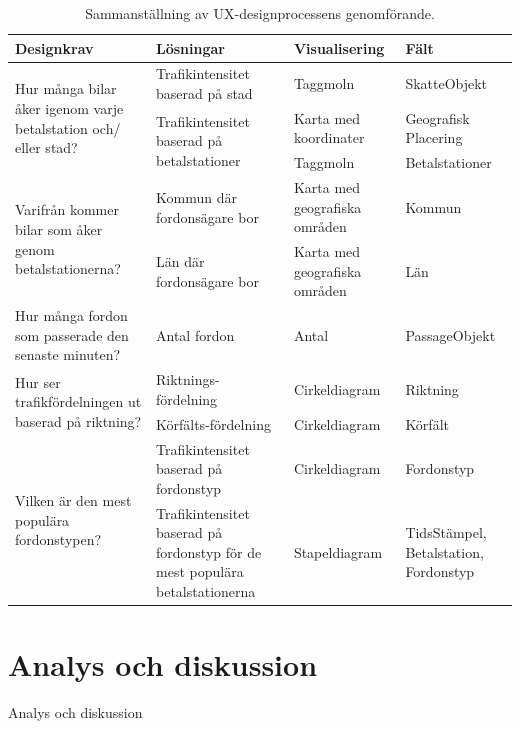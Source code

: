 \documentclass[12pt]{kththesis}
\begin{document}
\begin{table}[h!]
  \begin{center}
  \caption{Sammanställning av UX-designprocessens genomförande.}
    \label{tab:table1}
 \begin{tabular}{|p{3cm}|p{3cm}|p{3cm}|p{3cm}|}
      \hline
     \textbf{Designkrav} & \textbf{Lösningar} & \textbf{Visualisering} & \textbf{Fält}\\
     \hline
  \multirow{3}{3cm}{Hur många bilar åker igenom varje betalstation och/ eller stad?} &  Trafikintensitet baserad på stad & Taggmoln  & SkatteObjekt\\\cline{2-4}
  & \multirow{2}{3cm}{Trafikintensitet baserad på betalstationer} & Karta med koordinater
& Geografisk Placering\\\cline{3-4}  
  & &  Taggmoln
& Betalstationer \\ \hline


  \multirow{2}{3cm}{Varifrån kommer bilar som åker genom betalstationerna?} &  Kommun där fordonsägare bor & Karta med geografiska områden  & Kommun\\\cline{2-4}
  &Län där fordonsägare bor
 & Karta med geografiska områden  & Län\\ \hline
 
Hur många fordon som passerade den senaste minuten? &Antal fordon
 & Antal  & PassageObjekt\\ \hline
 
 \multirow{2}{3cm}{Hur ser trafikfördelningen ut baserad på riktning?} &  Riktnings-fördelning&Cirkeldiagram& Riktning\\\cline{2-4}
  &Körfälts-fördelning 
 & Cirkeldiagram  & Körfält\\ \hline
 
 \multirow{2}{3cm}{Vilken är den mest populära fordonstypen?} &  Trafikintensitet baserad på fordonstyp & Cirkeldiagram& Fordonstyp\\\cline{2-4}
  &Trafikintensitet baserad på fordonstyp för de mest populära betalstationerna 
 & Stapeldiagram  & TidsStämpel, Betalstation, Fordonstyp\\ \hline

\end{tabular}
\end{center}
\end{table}

\afterpage{\null\newpage}

\chapter{Analys och diskussion}
Analys och diskussion
\blindtext
\end{document}
